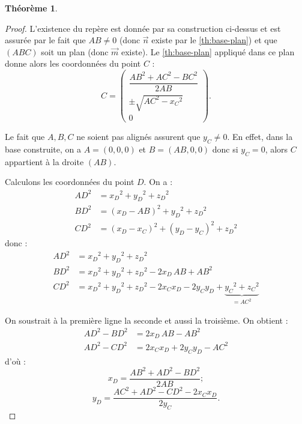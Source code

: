 \documentclass[french, a4paper, 12pt, parskip]{scrartcl}
\newtheorem{theorem}{Théorème}
\begin{document}
\begin{theorem}
\begin{center}
  \end{center}
\end{theorem}

\begin{proof}
  L'existence du repère est donnée par sa construction ci-dessus et est assurée
  par le fait que $AB\not=0$ (donc $\overrightarrow{n}$ existe par le
  \autoref{th:base-plan}) et que $(ABC)$ soit un plan (donc
  $\overrightarrow{m}$ existe). Le \autoref{th:base-plan} appliqué dans ce plan
  donne alors les coordonnées du point $C$ :
  \[
    C = \begin{pmatrix}
      \dfrac{{AB}^2 + {AC}^2 - {BC}^2}{2AB} \\[4mm]
      \pm\sqrt{{AC}^2 - {x_C}^2} \\[1mm]
      0
    \end{pmatrix}.
  \]

  Le fait que $A, B, C$ ne soient pas alignés assurent que $y_C \not = 0$. En
  effet, dans la base construite, on a $A=(0, 0, 0)$ et $B=(AB, 0, 0)$ donc si
  $y_C = 0$, alors $C$ appartient à la droite $(AB)$.

  Calculons les coordonnées du point $D$. On a :
  \begin{align*}
    {AD}^2 &= {x_D}^2 + {y_D}^2 + {z_D}^2 \\
    {BD}^2 &= \left(x_D-AB\right)^2 + {y_D}^2 + {z_D}^2 \\
    {CD}^2 &= \left(x_D-x_C\right)^2 + \left(y_D-y_C\right)^2 + {z_D}^2
  \end{align*}
  donc :
  \begin{align*}
    {AD}^2 &= {x_D}^2 + {y_D}^2 + {z_D}^2 \\
    {BD}^2 &= {x_D}^2 + {y_D}^2 + {z_D}^2 - 2x_D\,AB + {AB}^2 \\
    {CD}^2 &= {x_D}^2 + {y_D}^2 + {z_D}^2 - 2x_Cx_D - 2y_Cy_D + \underbrace{{y_C}^2 + {z_C}^2}_{={AC}^2}
  \end{align*}

  On soustrait à la première ligne la seconde et aussi la troisième. On obtient
  :
  \begin{align*}
    {AD}^2 - {BD}^2 &= 2x_D\,AB - {AB}^2 \\
    {AD}^2 - {CD}^2 &= 2x_Cx_D + 2y_Cy_D - {AC}^2
  \end{align*}
  d'où :
  \[
      \boxed{x_D = \frac{{AB}^2 + {AD}^2 - {BD}^2}{2AB}} ;
  \]
  \[
      \boxed{y_D = \frac{{AC}^2 + {AD}^2 - {CD}^2 - 2x_Cx_D }{2y_C}}.
  \]


\end{proof}
\end{document}

